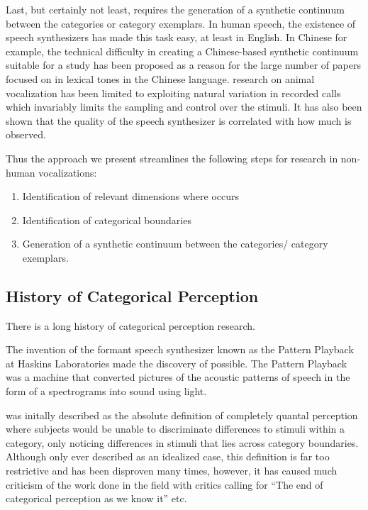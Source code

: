 Last, but certainly not least, \CP requires the generation of a synthetic continuum between the categories or category exemplars. In human speech, the existence of speech synthesizers has made this task easy, at least in English. In Chinese for example, the technical difficulty in creating a Chinese-based synthetic continuum suitable for a \CP study has been proposed as a reason for the large number of papers focused on \CP in lexical tones in the Chinese language\cite{zhang2013categorical}. \CP research on animal vocalization has been limited to exploiting natural variation in recorded calls\cite{swamp sparrow cp} which invariably limits the sampling and control over the stimuli. It has also been shown that the quality of the speech synthesizer is correlated with how much \CP is observed\cite{something}.

Thus the approach we present streamlines the following steps for \CP research in non-human vocalizations:
\begin{enumerate}
    \item Identification of relevant dimensions where \CP occurs
    \item Identification of categorical boundaries
    \item Generation of a synthetic continuum between the categories/ category exemplars.
\end{enumerate}

\subsection{History of Categorical Perception}

There is a long history of categorical perception research.

The invention of the formant speech synthesizer known as the Pattern Playback at Haskins Laboratories\cite{patternplayback} made the discovery of \CP possible.
The Pattern Playback was a machine that converted pictures of the acoustic patterns of speech in the form of a spectrograms into sound using light.

\CP was initally described as the absolute definition of completely quantal perception where subjects would be unable to discriminate differences to stimuli within a category, only noticing differences in stimuli that lies across category boundaries\cite{liberman1957discrimination, Studdert1970motor}. Although only ever described as an idealized case, this definition is far too restrictive and has been disproven many times, however, it has caused much criticism of the work done in the \CP field with critics calling for ``The end of categorical perception as we know it''\cite{schouten2003end} etc.

